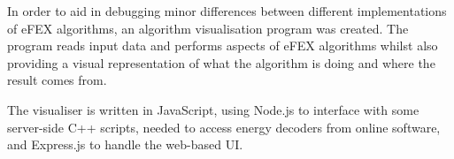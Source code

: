 In order to aid in debugging minor differences between different implementations
of \ac{eFEX} algorithms, an algorithm visualisation program was created.
%
The program reads input data and performs aspects of \ac{eFEX} algorithms whilst
also providing a visual representation of what the algorithm is doing and where
the result comes from.

The visualiser is written in JavaScript, using Node.js to interface with some
server-side C++ scripts, needed to access energy decoders from online software,
and Express.js to handle the web-based \ac{UI}.



